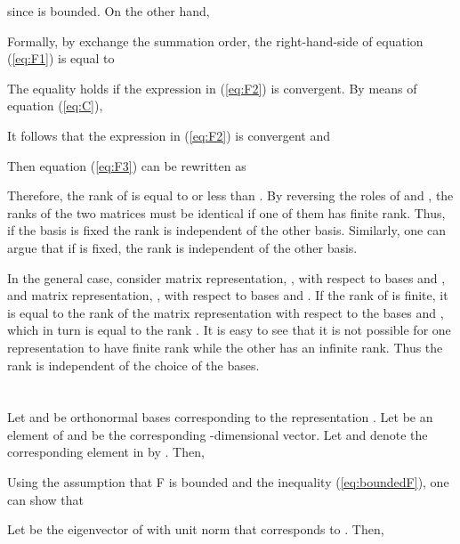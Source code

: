 \documentclass[12pt,onecolumn,draftcls]{IEEEtran}
\begin{document}
since   is bounded.  On the other hand,

Formally, by exchange the summation order, the right-hand-side of equation (\ref{eq:F1}) is equal to

The equality holds if the expression in (\ref{eq:F2}) is convergent.
By means of equation (\ref{eq:C}),

It follows that the expression in (\ref{eq:F2}) is convergent and

Then equation (\ref{eq:F3}) can be rewritten as

Therefore, the rank of  is equal to or less than .  By reversing the roles of  and ,
the ranks of the two matrices must be identical if one of them has finite rank.   Thus, if
the basis  is fixed the rank is independent of the other basis. 
Similarly, one can argue that if  is fixed, the rank is independent of the other basis.

In the general case, consider matrix representation, , with respect to bases
 and , and  matrix representation, , with respect to bases
 and .  If the rank of  is finite, it is equal to the rank of the
matrix representation with respect to the bases   and , which in turn
is equal to the rank .  It is easy to see that it is not possible for one representation to have finite
rank while the other has an infinite rank.  Thus the rank is independent of the choice of the bases.

\setcounter{section}{1}
\section{}\setcounter{equation}{0}
\setcounter{section}{9}

Let  and  be orthonormal bases corresponding to the representation .
Let   be an element of  and
 be the corresponding -dimensional vector.
Let 
and denote the corresponding element 
in  by .  Then,

Using the assumption that F is bounded and the inequality (\ref{eq:boundedF}), one can
show that


Let   be the eigenvector of  with unit norm
that corresponds to .  Then,

\vspace{-0.5in}
\end{document}

